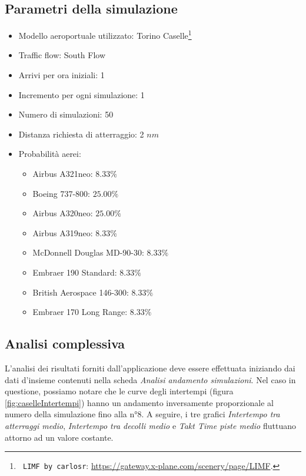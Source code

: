 \documentclass[a4paper, 12pt]{article}
\begin{document}
\subsection{Parametri della simulazione}
\begin{itemize}

\item Modello aeroportuale utilizzato: Torino Caselle\footnote{\texttt{ LIMF by carlosr}: \url{https://gateway.x-plane.com/scenery/page/LIMF}.}
\item Traffic flow: South Flow
\item Arrivi per ora iniziali: 1
\item Incremento per ogni simulazione: 1
\item Numero di simulazioni: 50
\item Distanza richiesta di atterraggio: 2 $nm$
\item Probabilità aerei:
\begin{itemize}
\item Airbus A321neo: $8.33\%$
\item Boeing 737-800: $25.00\%$
\item Airbus A320neo: $25.00\%$
\item Airbus A319neo: $8.33\%$
\item McDonnell Douglas MD-90-30: $8.33\%$
\item Embraer 190 Standard: $8.33\%$
\item British Aerospace 146-300: $8.33\%$
\item Embraer 170 Long Range: $8.33\%$
\end{itemize}

\end{itemize}

\subsection{Analisi complessiva}

L'analisi dei risultati forniti dall'applicazione deve essere effettuata iniziando dai dati d'insieme contenuti nella scheda \textit{Analisi andamento simulazioni}. Nel caso in questione, possiamo notare che le curve degli intertempi (figura \ref{fig:caselleIntertempi}) hanno un andamento inversamente proporzionale al numero della simulazione fino alla n°8. A seguire, i tre grafici \textit{Intertempo tra atterraggi medio}, \textit{Intertempo tra decolli medio} e \textit{Takt Time piste medio} fluttuano attorno ad un valore costante. 
\end{document}
